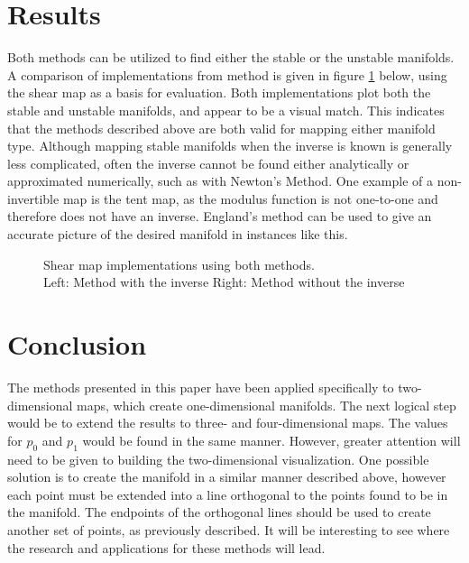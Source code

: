 \documentclass[12pt]{article}
\begin{document}
\section{Results}

    Both methods can be utilized to find either the stable or the unstable manifolds. A comparison of implementations from method is given in figure \ref{figure:shear} below, using the shear map as a basis for evaluation. Both implementations plot both the stable and unstable manifolds, and appear to be a visual match. This indicates that the methods described above are both valid for mapping either manifold type. Although mapping stable manifolds when the inverse is known is generally less complicated, often the inverse cannot be found either analytically or approximated numerically, such as with Newton's Method. One example of a non-invertible map is the tent map, as the modulus function is not one-to-one and therefore does not have an inverse. England's method can be used to give an accurate picture of the desired manifold in instances like this.

	\begin{figure}[H]
	 \caption{\centering Shear map implementations using both methods. \\ \centering Left: Method with the inverse\cite{Krauskopf1998} \hspace{3mm} Right: Method without the inverse\cite{England2004}}
	\label{figure:shear}
    \end{figure}



\section{Conclusion}
The methods presented in this paper have been applied specifically to two-dimensional maps, which create one-dimensional manifolds. The next logical step would be to extend the results to three- and four-dimensional maps. The values for $p_0$ and $p_1$ would be found in the same manner. However, greater attention will need to be given to building the two-dimensional visualization. One possible solution is to create the manifold in a similar manner described above, however each point must be extended into a line orthogonal to the points found to be in the manifold. The endpoints of the orthogonal lines should be used to create another set of points, as previously described. It will be interesting to see where the research and applications for these methods will lead.
 
\end{document}
